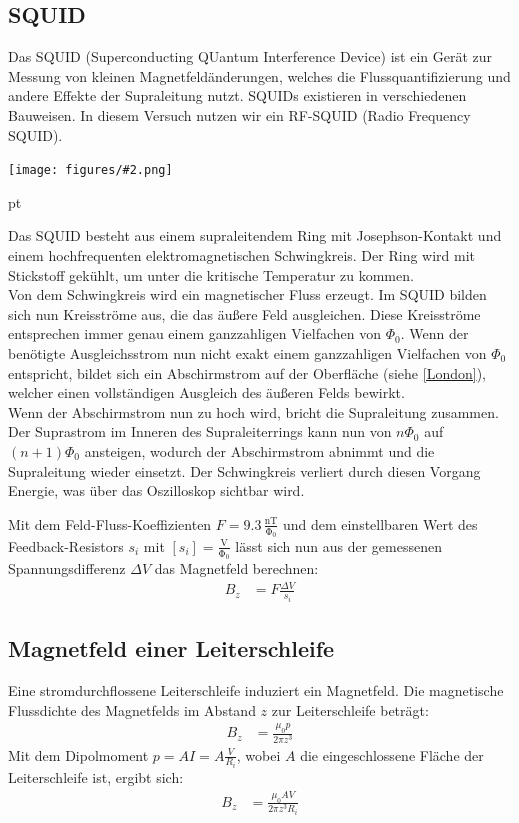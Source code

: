 \documentclass[12pt]{article}
\newcommand{\gra}[3][0.7]{
	\begin{minipage}[h!]{\textwidth}
		\centering
		\texttt{[image: figures/\#2.png]}
		\captionof{figure}{#3}
	\end{minipage}
	\vskip 30 pt
}
\begin{document}
\subsection{SQUID}
Das SQUID (Superconducting QUantum Interference Device) ist ein Gerät zur Messung von kleinen Magnetfeldänderungen, welches die Flussquantifizierung und andere Effekte der Supraleitung nutzt. SQUIDs existieren in verschiedenen Bauweisen. In diesem Versuch nutzen wir ein RF-SQUID (Radio Frequency SQUID).

\gra{squid}{Aufbau eines RF-SQUIDs}

Das SQUID besteht aus einem supraleitendem Ring mit Josephson-Kontakt und einem hochfrequenten elektromagnetischen Schwingkreis. Der Ring wird mit Stickstoff gekühlt, um unter die kritische Temperatur zu kommen.\\

Von dem Schwingkreis wird ein magnetischer Fluss erzeugt. Im SQUID bilden sich nun Kreisströme aus, die das äußere Feld ausgleichen. Diese Kreisströme entsprechen immer genau einem ganzzahligen Vielfachen von $\Phi_0$. Wenn der benötigte Ausgleichsstrom nun nicht exakt einem ganzzahligen Vielfachen von $\Phi_0$ entspricht, bildet sich ein Abschirmstrom auf der Oberfläche (siehe \ref{London}), welcher einen vollständigen Ausgleich des äußeren Felds bewirkt.\\

Wenn der Abschirmstrom nun zu hoch wird, bricht die Supraleitung zusammen. Der Suprastrom im Inneren des Supraleiterrings kann nun von $n\Phi_0$ auf $(n+1)\Phi_0$ ansteigen, wodurch der Abschirmstrom abnimmt und die Supraleitung wieder einsetzt. Der Schwingkreis verliert durch diesen Vorgang Energie, was über das Oszilloskop sichtbar wird.

Mit dem Feld-Fluss-Koeffizienten $F=9.3\,\mathrm{\frac{nT}{\Phi_0}}$ und dem einstellbaren Wert des Feedback-Resistors $s_i$ mit $[s_i]=\mathrm{\frac{V}{\Phi_0}}$ lässt sich nun aus der gemessenen Spannungsdifferenz $\Delta V$ das Magnetfeld berechnen:
\begin{align}
	B_z&=F\frac{\Delta V}{s_i}
\end{align}

\subsection{Magnetfeld einer Leiterschleife}
Eine stromdurchflossene Leiterschleife induziert ein Magnetfeld. Die magnetische Flussdichte des Magnetfelds im Abstand $z$ zur Leiterschleife beträgt:
\begin{align}
	B_z&=\frac{\mu_0p}{2\pi z^3} \label{Dipol}
\end{align} 
Mit dem Dipolmoment $p=AI=A\frac V{R_i}$, wobei $A$ die eingeschlossene Fläche der Leiterschleife ist, ergibt sich:
\begin{align}
B_z&=\frac{\mu_0AV}{2\pi z^3R_i} \label{11}
\end{align}
\end{document}
